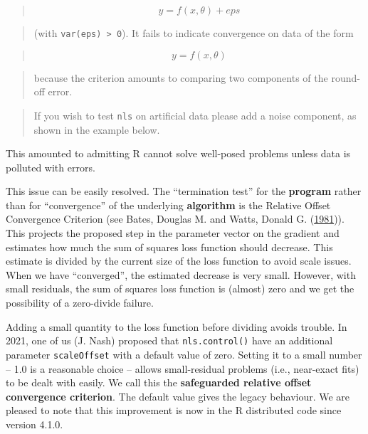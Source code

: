 \documentclass[
]{article}
\begin{document}
\begin{quote}
\[  y = f(x, \theta) + eps \]
\end{quote}

\begin{quote}
(with \texttt{var(eps)\ \textgreater{}\ 0}). It fails to indicate
convergence on data of the form
\end{quote}

\begin{quote}
\[  y = f(x, \theta)  \]
\end{quote}

\begin{quote}
because the criterion amounts to comparing two components of the
round-off error.
\end{quote}

\begin{quote}
If you wish to test \texttt{nls} on artificial data please add a noise
component, as shown in the example below.
\end{quote}

This amounted to admitting R cannot solve well-posed problems unless
data is polluted with errors.

This issue can be easily resolved. The ``termination test'' for the
\textbf{program} rather than for ``convergence'' of the underlying
\textbf{algorithm} is the Relative Offset Convergence Criterion (see
Bates, Douglas M. and Watts, Donald G.
(\protect\hyperlink{ref-BatesWatts81}{1981})). This projects the
proposed step in the parameter vector on the gradient and estimates how
much the sum of squares loss function should decrease. This estimate is
divided by the current size of the loss function to avoid scale issues.
When we have ``converged'', the estimated decrease is very small.
However, with small residuals, the sum of squares loss function is
(almost) zero and we get the possibility of a zero-divide failure.

Adding a small quantity to the loss function before dividing avoids
trouble. In 2021, one of us (J. Nash) proposed that
\texttt{nls.control()} have an additional parameter \texttt{scaleOffset}
with a default value of zero. Setting it to a small number -- 1.0 is a
reasonable choice -- allows small-residual problems (i.e., near-exact
fits) to be dealt with easily. We call this the \textbf{safeguarded
relative offset convergence criterion}. The default value gives the
legacy behaviour. We are pleased to note that this improvement is now in
the R distributed code since version 4.1.0.
\end{document}
